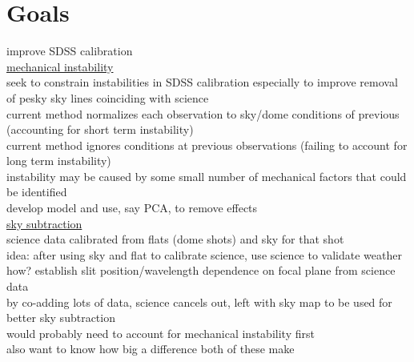 \documentclass[12pt]{article}
\newcommand{\ul}{\underline}
\begin{document}
\section*{Goals}
improve SDSS calibration\\
\ul{mechanical instability}\\
seek to constrain instabilities in SDSS calibration especially to improve removal of pesky sky lines coinciding with science\\
current method normalizes each observation to sky/dome conditions of previous (accounting for short term instability)\\
current method ignores conditions at previous observations (failing to account for long term instability)\\
instability may be caused by some small number of mechanical factors that could be identified\\
develop model and use, say PCA, to remove effects\\
\ul{sky subtraction}\\
science data calibrated from flats (dome shots) and sky for that shot\\
idea: after using sky and flat to calibrate science, use science to validate weather\\
how? establish slit position/wavelength dependence on focal plane from science data\\
by co-adding lots of data, science cancels out, left with sky map to be used for better sky subtraction\\
would probably need to account for mechanical instability first\\
also want to know how big a difference both of these make
\end{document}
